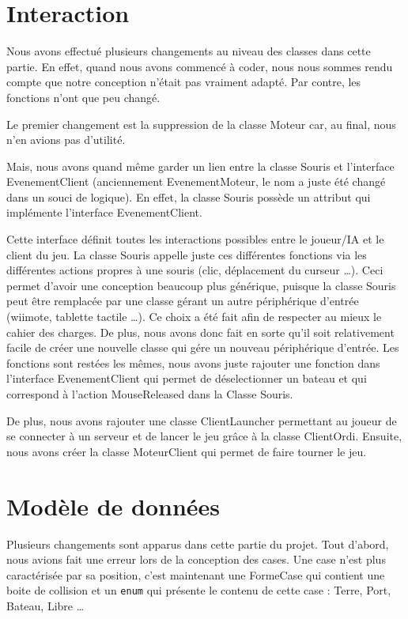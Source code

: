 
\section{Interaction }

Nous avons effectué plusieurs changements au niveau des classes dans cette partie. En effet, quand nous avons commencé à coder, nous nous sommes rendu compte que notre conception n'était pas vraiment adapté. Par contre, les fonctions n'ont que peu changé.

Le premier changement est la suppression de la classe Moteur car, au final, nous n'en avions pas d'utilité.

Mais, nous avons quand même garder un lien entre la classe Souris et l'interface EvenementClient (anciennement EvenementMoteur, le nom a juste été changé dans un souci de logique). En effet, la classe Souris possède un attribut qui implémente l'interface EvenementClient.

Cette interface définit toutes les interactions possibles entre le joueur/IA et le client du jeu. La classe Souris appelle juste ces différentes fonctions via les différentes actions propres à une souris (clic, déplacement du curseur \dots{}). Ceci permet d'avoir une conception beaucoup plus générique, puisque la classe Souris peut être remplacée par une classe gérant un autre périphérique d'entrée (wiimote, tablette tactile \dots{}). Ce choix a été fait afin de respecter au mieux le cahier des charges. De plus, nous avons donc fait en sorte qu'il soit relativement facile de créer une nouvelle classe qui gére un nouveau périphérique d'entrée.
Les fonctions sont restées les mêmes, nous avons juste rajouter une fonction dans l'interface EvenementClient qui permet de déselectionner un bateau et qui correspond à l'action MouseReleased dans la Classe Souris.

De plus, nous avons rajouter une classe ClientLauncher permettant au joueur de se connecter à un serveur et de lancer le jeu grâce à la classe ClientOrdi. Ensuite, nous avons créer la classe MoteurClient qui permet de faire tourner le jeu.


\section{Modèle de données}

Plusieurs changements sont apparus dans cette partie du projet. Tout d'abord, nous avions fait une erreur lors de la conception des cases. Une case n'est plus caractérisée par sa position, c'est maintenant une FormeCase qui contient une boite de collision et un \verb+enum+ qui présente le contenu de cette case : Terre, Port, Bateau, Libre \dots

